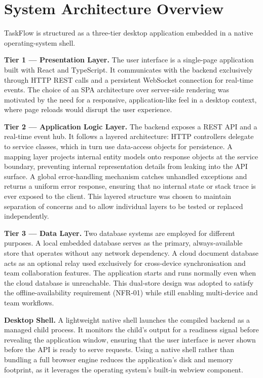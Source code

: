 \section{System Architecture Overview}\label{sec:meth_arch}

TaskFlow is structured as a three-tier desktop application embedded in a native
operating-system shell.

\textbf{Tier 1 --- Presentation Layer.}
The user interface is a single-page application built with React and TypeScript.
It communicates with the backend exclusively through HTTP REST calls and a
persistent WebSocket connection for real-time events. The choice of an SPA
architecture over server-side rendering was motivated by the need for a
responsive, application-like feel in a desktop context, where page reloads would
disrupt the user experience.

\textbf{Tier 2 --- Application Logic Layer.}
The backend exposes a REST API and a real-time event hub. It follows a layered
architecture: HTTP controllers delegate to service classes, which in turn use
data-access objects for persistence. A mapping layer projects internal entity
models onto response objects at the service boundary, preventing internal
representation details from leaking into the API surface. A global error-handling
mechanism catches unhandled exceptions and returns a uniform error response,
ensuring that no internal state or stack trace is ever exposed to the client.
This layered structure was chosen to maintain separation of concerns and to
allow individual layers to be tested or replaced independently.

\textbf{Tier 3 --- Data Layer.}
Two database systems are employed for different purposes. A local embedded
database serves as the primary, always-available store that operates without any
network dependency. A cloud document database acts as an optional relay used
exclusively for cross-device synchronisation and team collaboration features.
The application starts and runs normally even when the cloud database is
unreachable. This dual-store design was adopted to satisfy the offline-availability
requirement (NFR-01) while still enabling multi-device and team workflows.

\textbf{Desktop Shell.}
A lightweight native shell launches the compiled backend as a managed child
process. It monitors the child's output for a readiness signal before revealing
the application window, ensuring that the user interface is never shown before
the API is ready to serve requests. Using a native shell rather than bundling a
full browser engine reduces the application's disk and memory footprint, as it
leverages the operating system's built-in webview component.

